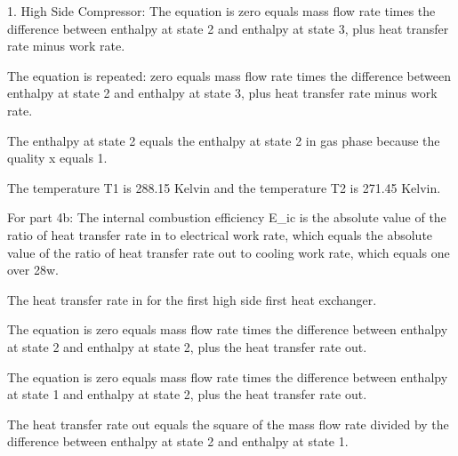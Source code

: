 1. High Side Compressor:
The equation is zero equals mass flow rate times the difference between enthalpy at state 2 and enthalpy at state 3, plus heat transfer rate minus work rate.

The equation is repeated: zero equals mass flow rate times the difference between enthalpy at state 2 and enthalpy at state 3, plus heat transfer rate minus work rate.

The enthalpy at state 2 equals the enthalpy at state 2 in gas phase because the quality x equals 1.

The temperature T1 is 288.15 Kelvin and the temperature T2 is 271.45 Kelvin.

For part 4b:
The internal combustion efficiency E_ic is the absolute value of the ratio of heat transfer rate in to electrical work rate, which equals the absolute value of the ratio of heat transfer rate out to cooling work rate, which equals one over 28w.

The heat transfer rate in for the first high side first heat exchanger.

The equation is zero equals mass flow rate times the difference between enthalpy at state 2 and enthalpy at state 2, plus the heat transfer rate out.

The equation is zero equals mass flow rate times the difference between enthalpy at state 1 and enthalpy at state 2, plus the heat transfer rate out.

The heat transfer rate out equals the square of the mass flow rate divided by the difference between enthalpy at state 2 and enthalpy at state 1.